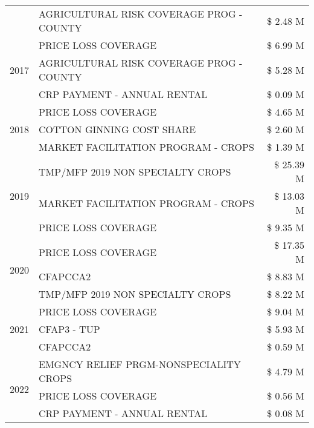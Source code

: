 \begin{tabular}{llr}
 & AGRICULTURAL RISK COVERAGE PROG - COUNTY & \$ 2.48 M \\
\cline{1-3}
\multirow[t]{3}{*}{2017} & PRICE LOSS COVERAGE & \$ 6.99 M \\
 & AGRICULTURAL RISK COVERAGE PROG - COUNTY & \$ 5.28 M \\
 & CRP PAYMENT - ANNUAL RENTAL & \$ 0.09 M \\
\cline{1-3}
\multirow[t]{3}{*}{2018} & PRICE LOSS COVERAGE & \$ 4.65 M \\
 & COTTON GINNING COST SHARE & \$ 2.60 M \\
 & MARKET FACILITATION PROGRAM - CROPS & \$ 1.39 M \\
\cline{1-3}
\multirow[t]{3}{*}{2019} & TMP/MFP 2019 NON SPECIALTY CROPS & \$ 25.39 M \\
 & MARKET FACILITATION PROGRAM - CROPS & \$ 13.03 M \\
 & PRICE LOSS COVERAGE & \$ 9.35 M \\
\cline{1-3}
\multirow[t]{3}{*}{2020} & PRICE LOSS COVERAGE & \$ 17.35 M \\
 & CFAPCCA2 & \$ 8.83 M \\
 & TMP/MFP 2019 NON SPECIALTY CROPS & \$ 8.22 M \\
\cline{1-3}
\multirow[t]{3}{*}{2021} & PRICE LOSS COVERAGE & \$ 9.04 M \\
 & CFAP3 - TUP & \$ 5.93 M \\
 & CFAPCCA2 & \$ 0.59 M \\
\cline{1-3}
\multirow[t]{3}{*}{2022} & EMGNCY RELIEF PRGM-NONSPECIALITY CROPS & \$ 4.79 M \\
 & PRICE LOSS COVERAGE & \$ 0.56 M \\
 & CRP PAYMENT - ANNUAL RENTAL & \$ 0.08 M \\
\cline{1-3}
\bottomrule
\end{tabular}
